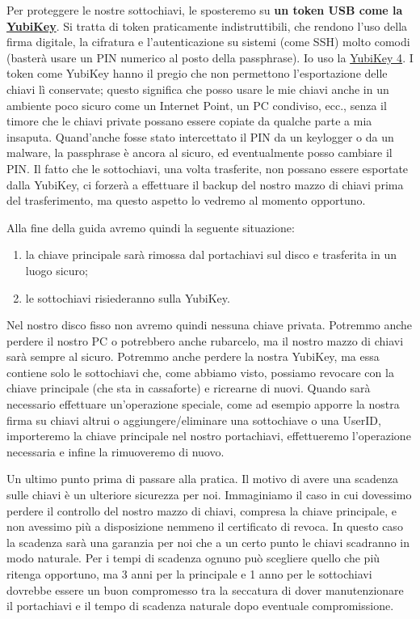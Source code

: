 \documentclass[a4paper,10pt]{article}
\begin{document}
Per proteggere le nostre sottochiavi, le sposteremo su \textbf{un token USB come la \href{https://www.yubico.com/}{YubiKey}}. Si tratta di token praticamente indistruttibili, che rendono l'uso della firma digitale, la cifratura e l'autenticazione su sistemi (come SSH) molto comodi (basterà usare un PIN numerico al posto della passphrase). Io uso la \href{https://www.yubico.com/product/yubikey-4-series/#yubikey-4}{YubiKey 4}. I token come YubiKey hanno il pregio che non permettono l'esportazione delle chiavi lì conservate; questo significa che posso usare le mie chiavi anche in un ambiente poco sicuro come un Internet Point, un PC condiviso, ecc., senza il timore che le chiavi private possano essere copiate da qualche parte a mia insaputa. Quand'anche fosse stato intercettato il PIN da un keylogger o da un malware, la passphrase è ancora al sicuro, ed eventualmente posso cambiare il PIN. Il fatto che le sottochiavi, una volta trasferite, non possano essere esportate dalla YubiKey, ci forzerà a effettuare il backup del nostro mazzo di chiavi prima del trasferimento, ma questo aspetto lo vedremo al momento opportuno.

Alla fine della guida avremo quindi la seguente situazione:

\begin{enumerate}
 \item la chiave principale sarà rimossa dal portachiavi sul disco e trasferita in un luogo sicuro;
 \item le sottochiavi risiederanno sulla YubiKey.
\end{enumerate}

Nel nostro disco fisso non avremo quindi nessuna chiave privata. Potremmo anche perdere il nostro PC o potrebbero anche rubarcelo, ma il nostro mazzo di chiavi sarà sempre al sicuro. Potremmo anche perdere la nostra YubiKey, ma essa contiene solo le sottochiavi che, come abbiamo visto, possiamo revocare con la chiave principale (che sta in cassaforte) e ricrearne di nuovi. Quando sarà necessario effettuare un'operazione speciale, come ad esempio apporre la nostra firma su chiavi altrui o aggiungere/eliminare una sottochiave o una UserID, importeremo la chiave principale nel nostro portachiavi, effettueremo l'operazione necessaria e infine la rimuoveremo di nuovo.

Un ultimo punto prima di passare alla pratica. Il motivo di avere una scadenza sulle chiavi è un ulteriore sicurezza per noi. Immaginiamo il caso in cui dovessimo perdere il controllo del nostro mazzo di chiavi, compresa la chiave principale, e non avessimo più a disposizione nemmeno il certificato di revoca. In questo caso la scadenza sarà una garanzia per noi che a un certo punto le chiavi scadranno in modo naturale. Per i tempi di scadenza ognuno può scegliere quello che più ritenga opportuno, ma 3 anni per la principale e 1 anno per le sottochiavi dovrebbe essere un buon compromesso tra la seccatura di dover manutenzionare il portachiavi e il tempo di scadenza naturale dopo eventuale compromissione.
\end{document}
